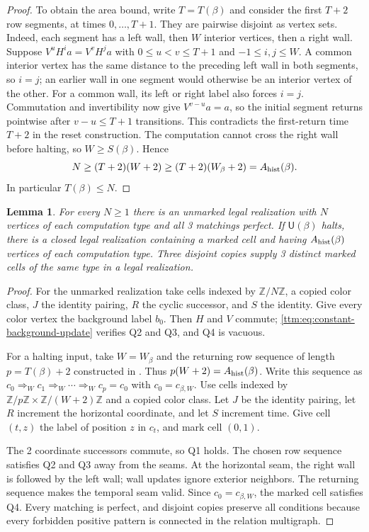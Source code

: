 \documentclass[10pt]{article}
\numberwithin{equation}{section}
\newtheorem{lemma}[lemma]{Lemma}\aliascntresetthe{lemma}
\theoremstyle{definition}
\begin{document}
\begin{proof}
To obtain the area bound, write $T=T(\beta)$ and consider the first $T+2$ row segments, at times $0,\ldots,T+1$. They are pairwise disjoint as vertex sets. Indeed, each segment has a left wall, then $W$ interior vertices, then a right wall. Suppose $V^uH^ia=V^vH^ja$ with $0\le u<v\le T+1$ and $-1\le i,j\le W$. A common interior vertex has the same distance to the preceding left wall in both segments, so $i=j$; an earlier wall in one segment would otherwise be an interior vertex of the other. For a common wall, its left or right label also forces $i=j$. Commutation and invertibility now give $V^{v-u}a=a$, so the initial segment returns pointwise after $v-u\le T+1$ transitions. This contradicts the first-return time $T+2$ in the reset construction. The computation cannot cross the right wall before halting, so $W\ge S(\beta)$. Hence
\[
 N\ge(T+2)(W+2)\ge(T+2)(W_\beta+2)=A_{\rm hist}(\beta).
\]
In particular $T(\beta)\le N$.

\end{proof}

\begin{lemma}
\label{lem:two-type-closed-constructions}
For every $N\ge1$ there is an unmarked legal realization with $N$ vertices of each computation type and all 3 matchings perfect. If $\mathsf U(\beta)$ halts, there is a closed legal realization containing a marked cell and having $A_{\rm hist}(\beta)$ vertices of each computation type. Three disjoint copies supply 3 distinct marked cells of the same type in a legal realization.
\end{lemma}
\begin{proof}
For the unmarked realization take cells indexed by $\mathbb Z/N\mathbb Z$, a copied color class, $J$ the identity pairing, $R$ the cyclic successor, and $S$ the identity. Give every color vertex the background label $b_0$. Then $H$ and $V$ commute;
\eqref{ttm:eq:constant-background-update} verifies Q2 and Q3,
and Q4 is vacuous.

For a halting input, take $W=W_\beta$ and the returning row sequence of length $p=T(\beta)+2$ constructed in . Thus $p(W+2)=A_{\rm hist}(\beta)$. Write this sequence as $c_0\Rightarrow_W c_1\Rightarrow_W\cdots\Rightarrow_W c_p=c_0$ with $c_0=c_{\beta,W}$. Use cells indexed by $\mathbb Z/p\mathbb Z\times\mathbb Z/(W+2)\mathbb Z$ and a copied color class. Let $J$ be the identity pairing, let $R$ increment the horizontal coordinate, and let $S$ increment time. Give cell $(t,z)$ the label of position $z$ in $c_t$, and mark cell $(0,1)$.

The 2 coordinate successors commute, so Q1 holds. The chosen row sequence satisfies Q2 and Q3 away from the seams. At the horizontal seam, the right wall is followed by the left wall; wall updates ignore exterior neighbors. The returning sequence makes the temporal seam valid. Since $c_0=c_{\beta,W}$, the marked cell satisfies Q4. Every matching is perfect, and disjoint copies preserve all conditions because every forbidden positive pattern is connected in the relation multigraph.
\end{proof}
\end{document}
